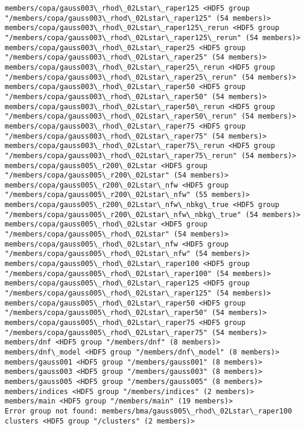 \documentclass[11pt]{article}
\begin{document}
\begin{Verbatim}[commandchars=\\\{\}]
members/copa/gauss003\_rhod\_02Lstar\_raper125 <HDF5 group "/members/copa/gauss003\_rhod\_02Lstar\_raper125" (54 members)>
members/copa/gauss003\_rhod\_02Lstar\_raper125\_rerun <HDF5 group "/members/copa/gauss003\_rhod\_02Lstar\_raper125\_rerun" (54 members)>
members/copa/gauss003\_rhod\_02Lstar\_raper25 <HDF5 group "/members/copa/gauss003\_rhod\_02Lstar\_raper25" (54 members)>
members/copa/gauss003\_rhod\_02Lstar\_raper25\_rerun <HDF5 group "/members/copa/gauss003\_rhod\_02Lstar\_raper25\_rerun" (54 members)>
members/copa/gauss003\_rhod\_02Lstar\_raper50 <HDF5 group "/members/copa/gauss003\_rhod\_02Lstar\_raper50" (54 members)>
members/copa/gauss003\_rhod\_02Lstar\_raper50\_rerun <HDF5 group "/members/copa/gauss003\_rhod\_02Lstar\_raper50\_rerun" (54 members)>
members/copa/gauss003\_rhod\_02Lstar\_raper75 <HDF5 group "/members/copa/gauss003\_rhod\_02Lstar\_raper75" (54 members)>
members/copa/gauss003\_rhod\_02Lstar\_raper75\_rerun <HDF5 group "/members/copa/gauss003\_rhod\_02Lstar\_raper75\_rerun" (54 members)>
members/copa/gauss005\_r200\_02Lstar <HDF5 group "/members/copa/gauss005\_r200\_02Lstar" (54 members)>
members/copa/gauss005\_r200\_02Lstar\_nfw <HDF5 group "/members/copa/gauss005\_r200\_02Lstar\_nfw" (55 members)>
members/copa/gauss005\_r200\_02Lstar\_nfw\_nbkg\_true <HDF5 group "/members/copa/gauss005\_r200\_02Lstar\_nfw\_nbkg\_true" (54 members)>
members/copa/gauss005\_rhod\_02Lstar <HDF5 group "/members/copa/gauss005\_rhod\_02Lstar" (54 members)>
members/copa/gauss005\_rhod\_02Lstar\_nfw <HDF5 group "/members/copa/gauss005\_rhod\_02Lstar\_nfw" (54 members)>
members/copa/gauss005\_rhod\_02Lstar\_raper100 <HDF5 group "/members/copa/gauss005\_rhod\_02Lstar\_raper100" (54 members)>
members/copa/gauss005\_rhod\_02Lstar\_raper125 <HDF5 group "/members/copa/gauss005\_rhod\_02Lstar\_raper125" (54 members)>
members/copa/gauss005\_rhod\_02Lstar\_raper50 <HDF5 group "/members/copa/gauss005\_rhod\_02Lstar\_raper50" (54 members)>
members/copa/gauss005\_rhod\_02Lstar\_raper75 <HDF5 group "/members/copa/gauss005\_rhod\_02Lstar\_raper75" (54 members)>
members/dnf <HDF5 group "/members/dnf" (8 members)>
members/dnf\_model <HDF5 group "/members/dnf\_model" (8 members)>
members/gauss001 <HDF5 group "/members/gauss001" (8 members)>
members/gauss003 <HDF5 group "/members/gauss003" (8 members)>
members/gauss005 <HDF5 group "/members/gauss005" (8 members)>
members/indices <HDF5 group "/members/indices" (2 members)>
members/main <HDF5 group "/members/main" (19 members)>
Error group not found: members/bma/gauss005\_rhod\_02Lstar\_raper100
clusters <HDF5 group "/clusters" (2 members)>

\end{Verbatim}
\end{document}
